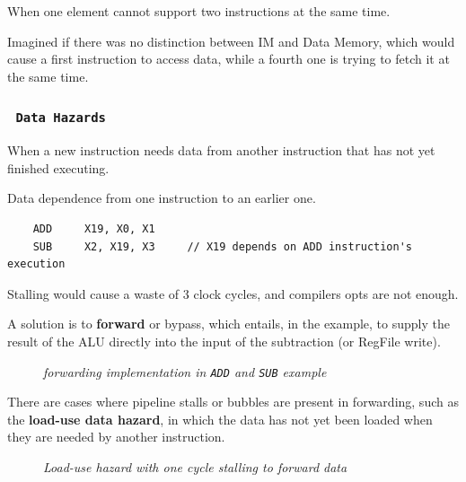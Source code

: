\documentclass[11pt]{article}
\begin{document}
When one element cannot support two instructions at the same time.

Imagined if there was no distinction between IM and Data Memory, which would cause a first instruction to access data, while a fourth one is trying to fetch it at the same time.

\subsubsection*{\rightarrow \ \texttt{Data Hazards}}
\vspace{-0.5em}

When a new instruction needs data from another instruction that has not yet finished executing.

Data dependence from one instruction to an earlier one.

\begin{verbatim}
    ADD     X19, X0, X1
    SUB     X2, X19, X3     // X19 depends on ADD instruction's execution
\end{verbatim}

Stalling would cause a waste of 3 clock cycles, and compilers opts are not enough.

A solution is to \textbf{forward} or bypass, which entails, in the example, to supply the result of the ALU directly into the input of the subtraction (or RegFile write).

\begin{figure}[htbp]
    \centering
    \caption{\textit{forwarding implementation in \texttt{ADD} and \texttt{SUB} example}}
\end{figure}

There are cases where pipeline stalls or bubbles are present in forwarding, such as the \textbf{load-use data hazard}, in which the data has not yet been loaded when they are needed by another instruction.

\pagebreak
\begin{figure}[htbp]
    \centering
    \caption{\textit{Load-use hazard with one cycle stalling to forward data}}
\end{figure}
\end{document}
